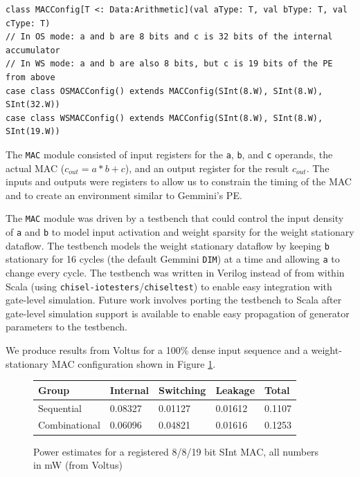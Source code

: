 \documentclass[sigconf]{acmart}
\begin{document}
\begin{verbatim}
class MACConfig[T <: Data:Arithmetic](val aType: T, val bType: T, val cType: T)
// In OS mode: a and b are 8 bits and c is 32 bits of the internal accumulator
// In WS mode: a and b are also 8 bits, but c is 19 bits of the PE from above
case class OSMACConfig() extends MACConfig(SInt(8.W), SInt(8.W), SInt(32.W))
case class WSMACConfig() extends MACConfig(SInt(8.W), SInt(8.W), SInt(19.W))
\end{verbatim}

The \texttt{MAC} module consisted of input registers for the \texttt{a}, \texttt{b}, and \texttt{c} operands, the actual MAC ($c_{out} = a*b + c$), and an output register for the result $c_{out}$.
The inputs and outputs were registers to allow us to constrain the timing of the MAC and to create an environment similar to Gemmini's PE.

The \texttt{MAC} module was driven by a testbench that could control the input density of \texttt{a} and \texttt{b} to model input activation and weight sparsity for the weight stationary dataflow.
The testbench models the weight stationary dataflow by keeping \texttt{b} stationary for 16 cycles (the default Gemmini \texttt{DIM}) at a time and allowing \texttt{a} to change every cycle.
The testbench was written in Verilog instead of from within Scala (using \texttt{chisel-iotesters}/\texttt{chiseltest}) to enable easy integration with gate-level simulation.
Future work involves porting the testbench to Scala after gate-level simulation support is available to enable easy propagation of generator parameters to the testbench.

We produce results from Voltus for a 100\% dense input sequence and a weight-stationary MAC configuration shown in Figure \ref{fig:mac_energy}.

\begin{figure}
\begin{tabular}{l l l l l}
  \toprule
  \textbf{Group} & \textbf{Internal} & \textbf{Switching} & \textbf{Leakage} & \textbf{Total} \\ \midrule
  Sequential & 0.08327 & 0.01127 & 0.01612 & 0.1107 \\
  Combinational & 0.06096 & 0.04821 & 0.01616 & 0.1253 \\
  \bottomrule
\end{tabular}
\caption{Power estimates for a registered 8/8/19 bit SInt MAC, all numbers in mW (from Voltus)}
\label{fig:mac_energy}
\end{figure}
\end{document}
